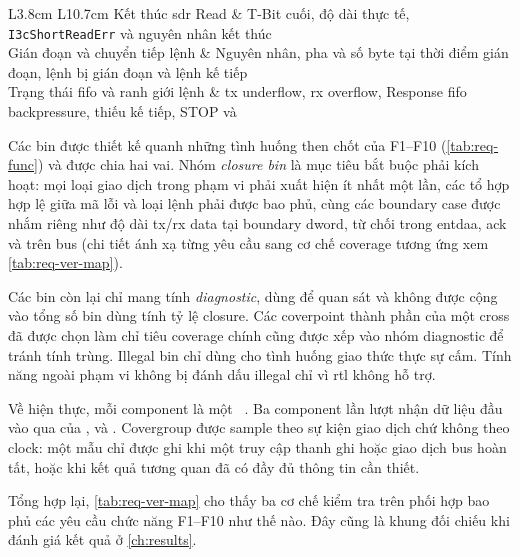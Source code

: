 \begin{table}[!htbp]
\begin{tabular}{L{3.8cm} L{10.7cm}}
		Kết thúc \gls{sdr} Read                 & T-Bit cuối, độ dài thực tế, \texttt{I3cShortReadErr} và nguyên nhân kết thúc                                                          \\
		Gián đoạn và chuyển tiếp lệnh           & Nguyên nhân, pha và số byte tại thời điểm gián đoạn, lệnh bị gián đoạn và lệnh kế tiếp                                                \\
		Trạng thái \gls{fifo} và ranh giới lệnh & \gls{tx} underflow, \gls{rx} overflow, Response \gls{fifo} backpressure, thiếu \CommandDescriptor{} kế tiếp, STOP và \RepeatedSTART{} \\
		\bottomrule
	\end{tabular}
\end{table}

Các bin được thiết kế quanh những tình huống then chốt của F1--F10 (\cref{tab:req-func}) và được
chia hai vai. Nhóm \emph{closure bin} là mục tiêu bắt buộc phải kích hoạt: mọi loại giao dịch
trong phạm vi phải xuất hiện ít nhất một lần, các tổ hợp hợp lệ giữa mã lỗi và loại lệnh phải
được bao phủ, cùng các boundary case được nhắm riêng như
độ dài \gls{tx}/\gls{rx} data tại boundary \gls{dword}, \Target{} từ chối \DynamicAddress{} trong \gls{entdaa}, \gls{ack} và
\TBit{} trên bus (chi tiết ánh xạ từng yêu cầu sang cơ chế coverage tương ứng xem
\cref{tab:req-ver-map}).

Các bin còn lại chỉ mang tính \emph{diagnostic}, dùng để quan sát và không được cộng vào tổng số
bin dùng tính tỷ lệ closure. Các coverpoint thành phần của một cross đã được chọn làm chỉ tiêu
coverage chính cũng được xếp vào nhóm diagnostic để tránh tính trùng. Illegal bin chỉ dùng cho
tình huống giao thức thực
sự cấm. Tính năng ngoài phạm vi không bị đánh dấu illegal chỉ vì \gls{rtl} không hỗ trợ.

Về hiện thực, mỗi component là một \UVMSubscriber{}~\cite{uvm12_ref}. Ba component lần lượt nhận dữ liệu đầu vào qua
\TLMAnalysisPort{} của \RegisterMonitor{}, \IThreeCMonitor{} và
\Scoreboard{}. Covergroup được sample theo sự kiện giao dịch chứ không theo clock:
một mẫu chỉ được ghi khi một truy cập thanh ghi hoặc giao dịch bus hoàn tất, hoặc khi kết quả
tương quan đã có đầy đủ thông tin cần thiết.

Tổng hợp lại, \cref{tab:req-ver-map} cho thấy ba cơ chế kiểm tra trên phối hợp bao phủ các yêu cầu
chức năng F1--F10 như thế nào. Đây cũng là khung đối chiếu khi đánh giá kết quả ở \cref{ch:results}.

